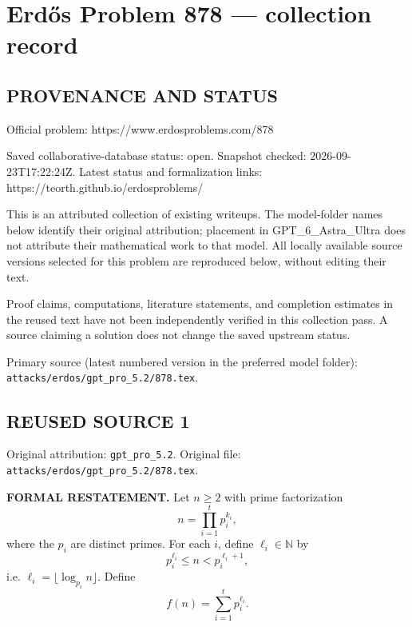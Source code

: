 \section*{Erd\H{o}s Problem 878 --- collection record}

\subsection*{PROVENANCE AND STATUS}
Official problem: https://www.erdosproblems.com/878

Saved collaborative-database status: open.
Snapshot checked: 2026-09-23T17:22:24Z.
Latest status and formalization links: https://teorth.github.io/erdosproblems/

This is an attributed collection of existing writeups. The model-folder names below identify their original attribution; placement in GPT\_6\_Astra\_Ultra does not attribute their mathematical work to that model. All locally available source versions selected for this problem are reproduced below, without editing their text.

Proof claims, computations, literature statements, and completion estimates in the reused text have not been independently verified in this collection pass. A source claiming a solution does not change the saved upstream status.

Primary source (latest numbered version in the preferred model folder): \texttt{attacks/erdos/gpt\_pro\_5.2/878.tex}.

\subsection*{REUSED SOURCE 1}
Original attribution: \texttt{gpt\_pro\_5.2}.
Original file: \texttt{attacks/erdos/gpt\_pro\_5.2/878.tex}.


\noindent\textbf{FORMAL RESTATEMENT.}
Let $n\ge 2$ with prime factorization
\[
 n=\prod_{i=1}^t p_i^{k_i},
\]
where the $p_i$ are distinct primes.
For each $i$, define $\ell_i\in\mathbb N$ by
\[
 p_i^{\ell_i}\le n < p_i^{\ell_i+1},
\]
i.e. $\ell_i=\lfloor\log_{p_i} n\rfloor$.
Define
\[
 f(n)=\sum_{i=1}^t p_i^{\ell_i}.
\]

